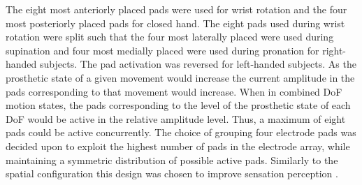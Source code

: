 The eight most anteriorly placed pads were used for wrist rotation and the four most posteriorly placed pads for closed hand. The eight pads used during wrist rotation were split such that the four most laterally placed were used during supination and four most medially placed were used during pronation for right-handed subjects. The pad activation was reversed for left-handed subjects. As the prosthetic state of a given movement would increase the current amplitude in the pads corresponding to that movement would increase. When in combined DoF motion states, the pads corresponding to the level of the prosthetic state of each DoF would be active in the relative amplitude level. Thus, a maximum of eight pads could be active concurrently. The choice of grouping four electrode pads was decided upon to exploit the highest number of pads in the electrode array, while maintaining a symmetric distribution of possible active pads. Similarly to the spatial configuration this design was chosen to improve sensation perception \cite{Dosen2015}.


